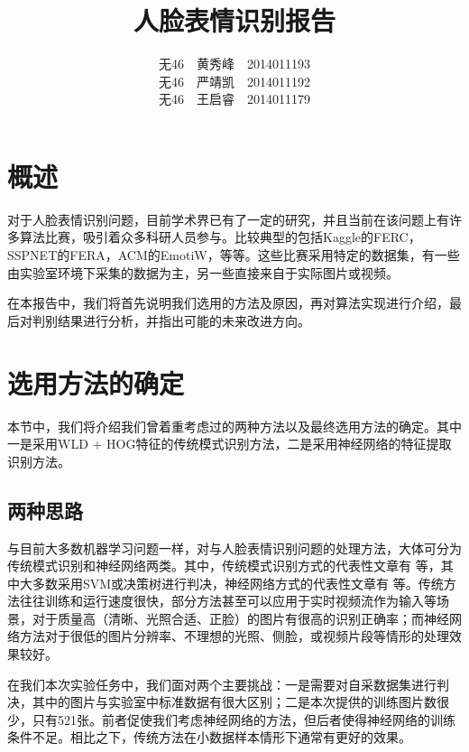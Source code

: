 \documentclass[UTF8]{ctexart}
\begin{document}
\title{人脸表情识别报告}
\author{无46\ \ 黄秀峰\ \ 2014011193\\ 无46\ \ 严靖凯\ \ 2014011192\\ 无46\ \ 王启睿\ \ 2014011179}
\maketitle

\section{概述}

对于人脸表情识别问题，目前学术界已有了一定的研究，并且当前在该问题上有许多算法比赛，吸引着众多科研人员参与。比较典型的包括Kaggle的FERC，SSPNET的FERA，ACM的EmotiW，等等。这些比赛采用特定的数据集，有一些由实验室环境下采集的数据为主，另一些直接来自于实际图片或视频。

在本报告中，我们将首先说明我们选用的方法及原因，再对算法实现进行介绍，最后对判别结果进行分析，并指出可能的未来改进方向。

\section{选用方法的确定}

本节中，我们将介绍我们曾着重考虑过的两种方法以及最终选用方法的确定。其中一是采用WLD + HOG特征的传统模式识别方法，二是采用神经网络的特征提取识别方法。

\subsection{两种思路}

与目前大多数机器学习问题一样，对与人脸表情识别问题的处理方法，大体可分为传统模式识别和神经网络两类。其中，传统模式识别方式的代表性文章有
\cite{happy2015automatic,islam2016sention,wang2013feature,salmam2016facial}等，其中大多数采用SVM或决策树进行判决，神经网络方式的代表性文章有
\cite{BarsoumICMI2016,khorrami2015deep}等。传统方法往往训练和运行速度很快，部分方法甚至可以应用于实时视频流作为输入等场景，对于质量高（清晰、光照合适、正脸）的图片有很高的识别正确率；而神经网络方法对于很低的图片分辨率、不理想的光照、侧脸，或视频片段等情形的处理效果较好。

在我们本次实验任务中，我们面对两个主要挑战：一是需要对自采数据集进行判决，其中的图片与实验室中标准数据有很大区别；二是本次提供的训练图片数很少，只有521张。前者促使我们考虑神经网络的方法，但后者使得神经网络的训练条件不足。相比之下，传统方法在小数据样本情形下通常有更好的效果。
\end{document}
